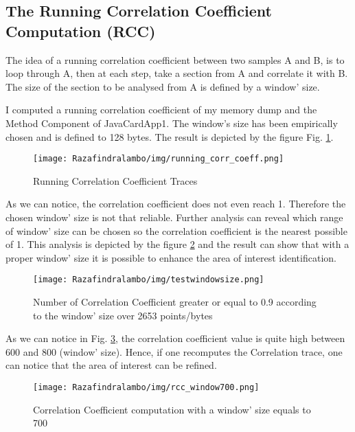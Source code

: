 \subsection{The Running Correlation Coefficient Computation (RCC)}
The idea of a running correlation coefficient between two samples A and B, is to loop through A, then
at each step, take a section from A and correlate it with B. The size of the section to be analysed
from A is defined by a window' size.   

I computed a running correlation coefficient of my memory dump and the Method Component of
JavaCardApp1. The window's size has been empirically chosen and is defined to
128 bytes. The result is depicted by the figure Fig. \ref{fig:runncorrcoeff}.

\begin{figure}[!h]
    \center
    \texttt{[image: Razafindralambo/img/running\_corr\_coeff.png]}
    \caption{Running Correlation Coefficient Traces}
    \label{fig:runncorrcoeff}
\end{figure}

As we can notice, the correlation coefficient does not even reach 1. Therefore the chosen window' size
is not that reliable. Further analysis can reveal which range of window' size can be chosen so the
correlation coefficient is the nearest possible of 1. This analysis is depicted by the figure
\ref{fig:testwindowsize} and the result can show that with a proper window' size it is possible to
enhance the area of interest identification. 

\begin{figure}[!h]
    \center
    \texttt{[image: Razafindralambo/img/testwindowsize.png]}
    \caption{Number of Correlation Coefficient greater or equal to 0.9 according to
    the window' size over 2653 points/bytes}
    \label{fig:testwindowsize}
\end{figure} 

As we can notice in Fig. \ref{fig:window700}, the correlation coefficient value is quite high between 600 and 800 (window'
size). Hence, if one recomputes the Correlation trace, one can notice that the area of interest can
be refined.

\begin{figure}[!h]
    \center
    \texttt{[image: Razafindralambo/img/rcc\_window700.png]}
    \caption{Correlation Coefficient computation with a window' size equals to 700}
    \label{fig:window700}
\end{figure}

